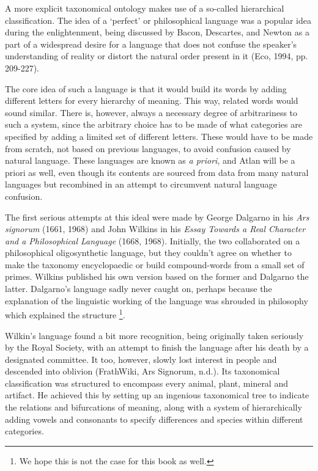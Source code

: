 \vspace{-0.1cm}
A more explicit taxonomical ontology makes use of a so-called hierarchical classification. The idea of a ‘perfect’ or philosophical language was a popular idea during the enlightenment, being discussed by Bacon, Descartes, and Newton as a part of a widespread desire for a language that does not confuse the speaker’s understanding of reality or distort the natural order present in it (Eco, 1994, pp. 209-227). 

The core idea of such a language is that it would build its words by adding different letters for every hierarchy of meaning. This way, related words would sound similar. There is, however, always a necessary degree of arbitrariness to such a system, since the arbitrary choice has to be made of what categories are specified by adding a limited set of different letters. These would have to be made from scratch, not based on previous languages, to avoid confusion caused by natural language. These languages are known as {\it a priori}, and Atlan will be a priori as well, even though its contents are sourced from data from many natural languages but recombined in an attempt to circumvent natural language confusion.  

The first serious attempts at this ideal were made by George Dalgarno in his {\it Ars signorum} (1661, 1968) and John Wilkins in his \textit{Essay Towards a Real Character and a Philosophical Language} (1668, 1968). Initially, the two collaborated on a philosophical oligosynthetic language, but they couldn’t agree on whether to make the taxonomy encyclopaedic or build compound-words from a small set of primes. Wilkins published his own version based on the former and Dalgarno the latter. Dalgarno’s language sadly never caught on, perhaps because the explanation of the linguistic working of the language was shrouded in philosophy which explained the structure \footnote{We hope this is not the case for this book as well.}. 

Wilkin’s language found  a bit more recognition, being originally taken seriously by the Royal Society, with an attempt to finish the language after his death by a designated committee. It too, however, slowly lost interest in people and descended into oblivion  (FrathWiki, Ars Signorum, n.d.). Its taxonomical classification was structured to encompass every animal, plant, mineral and artifact. He achieved this by setting up an ingenious taxonomical tree to indicate the relations and bifurcations of meaning, along with a system of hierarchically adding vowels and consonants to specify differences and species within different categories. 


